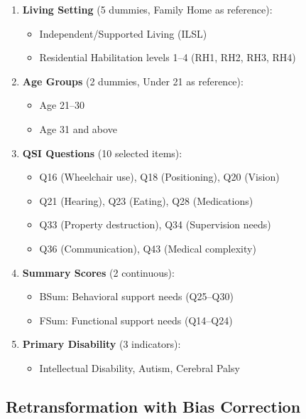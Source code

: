 \begin{enumerate}
    \item \textbf{Living Setting} (5 dummies, Family Home as reference):
    \begin{itemize}
        \item Independent/Supported Living (ILSL)
        \item Residential Habilitation levels 1--4 (RH1, RH2, RH3, RH4)
    \end{itemize}
    
    \item \textbf{Age Groups} (2 dummies, Under 21 as reference):
    \begin{itemize}
        \item Age 21--30
        \item Age 31 and above
    \end{itemize}
    
    \item \textbf{QSI Questions} (10 selected items):
    \begin{itemize}
        \item Q16 (Wheelchair use), Q18 (Positioning), Q20 (Vision)
        \item Q21 (Hearing), Q23 (Eating), Q28 (Medications)
        \item Q33 (Property destruction), Q34 (Supervision needs)
        \item Q36 (Communication), Q43 (Medical complexity)
    \end{itemize}
    
    \item \textbf{Summary Scores} (2 continuous):
    \begin{itemize}
        \item BSum: Behavioral support needs (Q25--Q30)
        \item FSum: Functional support needs (Q14--Q24)
    \end{itemize}
    
    \item \textbf{Primary Disability} (3 indicators):
    \begin{itemize}
        \item Intellectual Disability, Autism, Cerebral Palsy
    \end{itemize}
\end{enumerate}

\subsection{Retransformation with Bias Correction}

